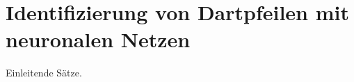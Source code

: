 
\chapter{Identifizierung von Dartpfeilen mit neuronalen Netzen}
\label{cha:ki}

Einleitende Sätze.





